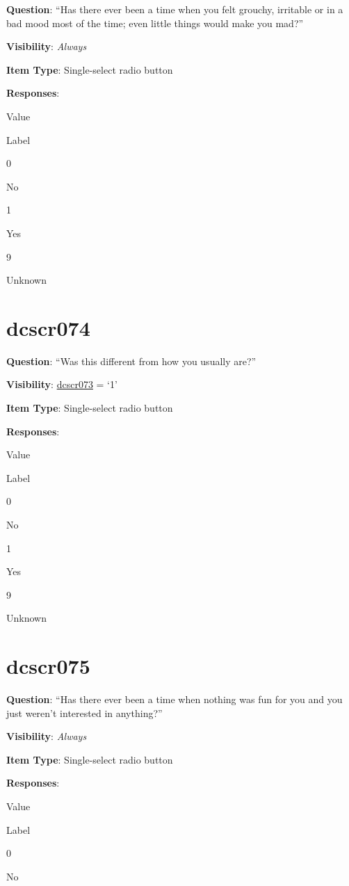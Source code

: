 \documentclass[]{book}
\begin{document}
\textbf{Question}: ``Has there ever been a time when you felt grouchy, irritable or in a bad mood most of the time; even little things would make you mad?''

\textbf{Visibility}: \emph{Always}

\textbf{Item Type}: Single-select radio button

\textbf{Responses}:

Value

Label

0

No

1

Yes

9

Unknown

\hypertarget{dcscr074}{%
\section{dcscr074}\label{dcscr074}}

\textbf{Question}: ``Was this different from how you usually are?''

\textbf{Visibility}: \protect\hyperlink{dcscr073}{dcscr073} = `1'

\textbf{Item Type}: Single-select radio button

\textbf{Responses}:

Value

Label

0

No

1

Yes

9

Unknown

\hypertarget{dcscr075}{%
\section{dcscr075}\label{dcscr075}}

\textbf{Question}: ``Has there ever been a time when nothing was fun for you and you just weren't interested in anything?''

\textbf{Visibility}: \emph{Always}

\textbf{Item Type}: Single-select radio button

\textbf{Responses}:

Value

Label

0

No
\end{document}
